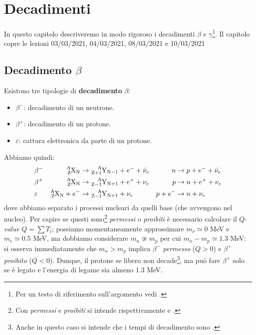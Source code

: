 \chapter{Decadimenti}\label{sec-decadimenti}
In questo capitolo descriveremo in modo rigoroso i decadimenti $\beta$ e $\gamma$\footnote{Per un testo di riferimento sull'argomento vedi .}. Il capitolo copre le lezioni 03/03/2021, 04/03/2021, 08/03/2021 e 10/03/2021
\section{Decadimento $\beta$}
Esistono tre tipologie di \textbf{decadimento} $\beta$:
\begin{itemize}
    \item $\beta^-$: decadimento di un neutrone.
    \item $\beta^+$: decadimento di un protone.
    \item $\varepsilon$: cattura elettronica da parte di un protone.
\end{itemize}
\noindent Abbiamo quindi:
\begin{displaymath}
\begin{aligned}
&\beta^- & \ce{^A_ZX_N}&\to \ce{^A_{Z+1}Y_{N-1}} + e^- + \bar{\nu}_e & n&\to p + e^- + \bar{\nu}_e \\
&\beta^+ & \ce{^A_ZX_N}&\to \ce{^A_{Z-1}Y_{N+1}} + e^+ + \nu_e & p &\to n + e^+ + \nu_e \\
&\varepsilon & \ce{^A_ZX_N} + e^-&\to \ce{^A_{Z-1}Y_{N+1}}  + \nu_e & p+e^- &\to n + \nu_e
\end{aligned}
\end{displaymath}
dove abbiamo separato i processi nucleari da quelli base (che avvengono nel nucleo). Per capire se questi sono\footnote{Con \textit{permessi} e \textit{proibiti} si intende rispettivamente  e .} \textit{permessi} o \textit{proibiti} è necessario calcolare il $Q$-\textit{value} $Q=\sum T_i$; possiamo momentaneamente approssimare $m_{\nu}\simeq 0$ MeV e $m_e \simeq 0.5$ MeV, ma dobbiamo considerare $m_n \not \simeq m_p$ per cui $m_n - m_p \simeq 1.3$ MeV: si osserva immediatamente che $m_n>m_p$ implica $\beta^-$ \textit{permesso} ($Q>0$) e $\beta^+$ \textit{proibito} ($Q<0$). Dunque, il protone se libero non decade\footnote{Anche in questo caso si intende che i tempi di decadimento sono .}, ma può fare $\beta^+$ solo se è legato e l'energia di legame sia almeno 1.3 MeV.

